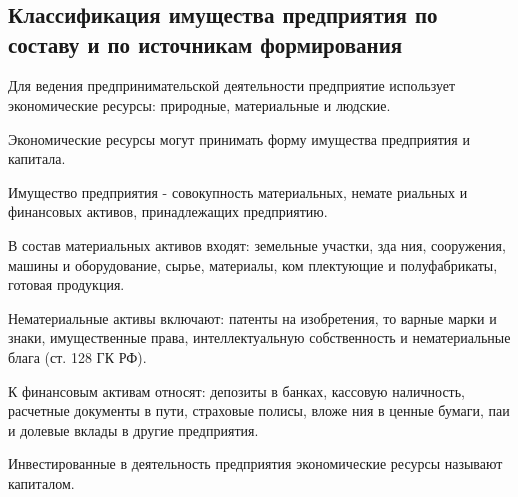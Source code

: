 \chapter{}

\section{Классификация имущества предприятия по составу и по источникам
формирования}


Для ведения предпринимательской деятельности предприятие использует
экономические ресурсы: природные, материальные и людские.

Экономические ресурсы могут принимать форму имущества предприятия и капитала.

Имущество предприятия - совокупность материальных, немате риальных и финансовых активов, принадлежащих предприятию.

В состав материальных активов входят: земельные участки, зда ния, сооружения, машины и оборудование, сырье, материалы, ком плектующие и полуфабрикаты, готовая продукция.

Нематериальные активы включают: патенты на изобретения, то варные марки и знаки, имущественные права, интеллектуальную собственность и нематериальные блага (ст. 128 ГК РФ).

К финансовым активам относят: депозиты в банках, кассовую наличность, расчетные документы в пути, страховые полисы, вложе ния в ценные бумаги, паи и долевые вклады в другие предприятия.

Инвестированные в деятельность предприятия экономические ресурсы называют капиталом.
